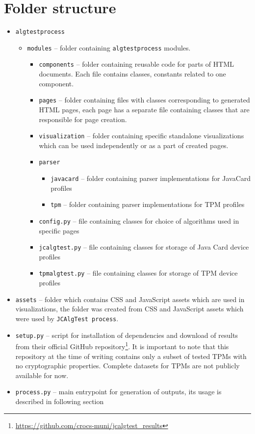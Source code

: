 \section{Folder structure}
\begin{itemize}
    \item \texttt{algtestprocess}
        \begin{itemize}
            \item \texttt{modules} -- folder containing \texttt{algtestprocess} modules.
                \begin{itemize}
                    \item \texttt{components} -- folder containing reusable code for parts of HTML documents. Each file contains classes, constants related to one component.
                    \item \texttt{pages} -- folder containing files with classes corresponding to generated HTML pages, each page has a separate file containing classes that are responsible for page creation.
                    \item \texttt{visualization} -- folder containing specific standalone visualizations which can be used independently or as a part of created pages.
                    \item \texttt{parser}
                        \begin{itemize}
                            \item \texttt{javacard} -- folder containing parser implementations for JavaCard profiles
                            \item \texttt{tpm} -- folder containing parser implementations for TPM profiles
                        \end{itemize}
                    \item \texttt{config.py} -- file containing classes for choice of algorithms used in specific pages
                    \item \texttt{jcalgtest.py} -- file containing classes for storage of Java Card device profiles
                    \item \texttt{tpmalgtest.py} -- file containing classes for storage of TPM device profiles
                \end{itemize}
        \end{itemize}
    \item \texttt{assets} -- folder which contains CSS and JavaScript assets which are used in visualizations, the folder was created from CSS and JavaScript assets which were used by \texttt{JCAlgTest process}.
    \item \texttt{setup.py} -- script for installation of dependencies and download of results from their official GitHub repository\footnote{\url{https://github.com/crocs-muni/jcalgtest_results}}. It is important to note that this repository at the time of writing contains only a subset of tested TPMs with no cryptographic properties. Complete datasets for TPMs are not publicly available for now.
    \item \texttt{process.py} -- main entrypoint for generation of outputs, its usage is described in following section
\end{itemize}

